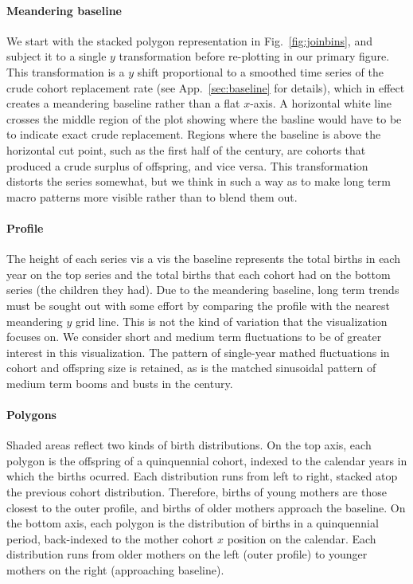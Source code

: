 \documentclass{article}
\begin{document}
\paragraph{Meandering baseline} We start with the stacked polygon representation in Fig.~\ref{fig:joinbins}, and subject it to a single $y$ transformation before re-plotting in our primary figure. This transformation is a $y$ shift proportional to a smoothed time series of the crude cohort replacement rate (see App.~\ref{sec:baseline} for details), which in effect creates a meandering baseline rather than a flat $x$-axis. A horizontal white line crosses the middle region of the plot showing where the basline would have to be to indicate exact crude replacement. Regions where the baseline is above the horizontal cut point, such as the first half of the  century, are cohorts that produced a crude surplus of offspring, and vice versa. This transformation distorts the series somewhat, but we think in such a way as to make long term macro patterns more visible rather than to blend them out.

\paragraph{Profile} The height of each series vis a vis the baseline represents the total births in each year on the top series and the total births that each cohort had on the bottom series (the children they had). Due to the meandering baseline, long term trends must be sought out with some effort by comparing the profile with the nearest meandering $y$ grid line. This is not the kind of variation that the visualization focuses on. We consider short and medium term fluctuations to be of greater interest in this visualization. The pattern of single-year mathed fluctuations in cohort and offspring size is retained, as is the matched sinusoidal pattern of medium term booms and busts in the  century.

\paragraph{Polygons} Shaded areas reflect two kinds of birth distributions. On the top axis, each polygon is the offspring of a quinquennial cohort, indexed to the calendar years in which the births ocurred. Each distribution runs from left to right, stacked atop the previous cohort distribution. Therefore, births of young mothers are those closest to the outer profile, and births of older mothers approach the baseline. On the bottom axis, each polygon is the distribution of births in a quinquennial period, back-indexed to the mother cohort $x$ position on the calendar. Each distribution runs from older mothers on the left (outer profile) to younger mothers on the right (approaching baseline). 
\end{document}
